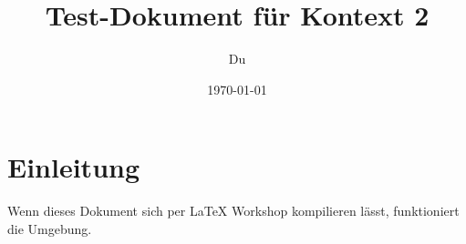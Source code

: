 \documentclass[a4paper,12pt]{article}
\title{Test-Dokument für Kontext 2}
\author{Du}
\date{\today}
\begin{document}
\maketitle

\section{Einleitung}
Wenn dieses Dokument sich per LaTeX Workshop kompilieren lässt, funktioniert die Umgebung.
\end{document}
